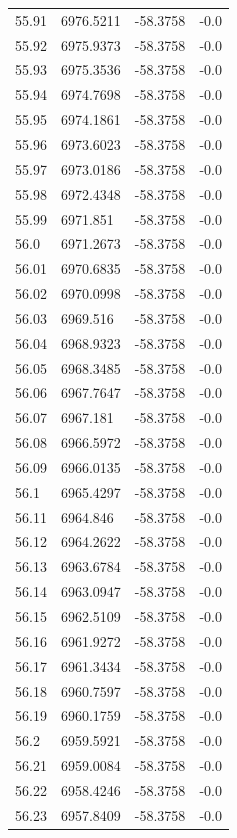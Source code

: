 \begin{table}[H]
\begin{tabular}{llll}
55.91 & 6976.5211 & -58.3758 & -0.0 \\
55.92 & 6975.9373 & -58.3758 & -0.0 \\
55.93 & 6975.3536 & -58.3758 & -0.0 \\
55.94 & 6974.7698 & -58.3758 & -0.0 \\
55.95 & 6974.1861 & -58.3758 & -0.0 \\
55.96 & 6973.6023 & -58.3758 & -0.0 \\
55.97 & 6973.0186 & -58.3758 & -0.0 \\
55.98 & 6972.4348 & -58.3758 & -0.0 \\
55.99 & 6971.851 & -58.3758 & -0.0 \\
56.0 & 6971.2673 & -58.3758 & -0.0 \\
56.01 & 6970.6835 & -58.3758 & -0.0 \\
56.02 & 6970.0998 & -58.3758 & -0.0 \\
56.03 & 6969.516 & -58.3758 & -0.0 \\
56.04 & 6968.9323 & -58.3758 & -0.0 \\
56.05 & 6968.3485 & -58.3758 & -0.0 \\
56.06 & 6967.7647 & -58.3758 & -0.0 \\
56.07 & 6967.181 & -58.3758 & -0.0 \\
56.08 & 6966.5972 & -58.3758 & -0.0 \\
56.09 & 6966.0135 & -58.3758 & -0.0 \\
56.1 & 6965.4297 & -58.3758 & -0.0 \\
56.11 & 6964.846 & -58.3758 & -0.0 \\
56.12 & 6964.2622 & -58.3758 & -0.0 \\
56.13 & 6963.6784 & -58.3758 & -0.0 \\
56.14 & 6963.0947 & -58.3758 & -0.0 \\
56.15 & 6962.5109 & -58.3758 & -0.0 \\
56.16 & 6961.9272 & -58.3758 & -0.0 \\
56.17 & 6961.3434 & -58.3758 & -0.0 \\
56.18 & 6960.7597 & -58.3758 & -0.0 \\
56.19 & 6960.1759 & -58.3758 & -0.0 \\
56.2 & 6959.5921 & -58.3758 & -0.0 \\
56.21 & 6959.0084 & -58.3758 & -0.0 \\
56.22 & 6958.4246 & -58.3758 & -0.0 \\
56.23 & 6957.8409 & -58.3758 & -0.0 \\

\end{tabular}
\end{table}

